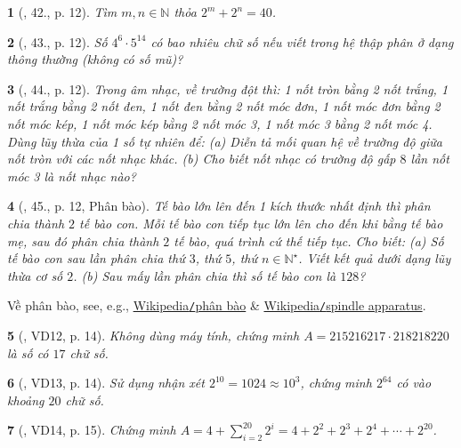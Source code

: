 \documentclass{article}
\newtheorem{baitoan}{}
\begin{document}
\begin{baitoan}[\cite{Tuyen_Toan_6}, 42., p. 12]
	Tìm $m,n\in\mathbb{N}$ thỏa $2^m + 2^n = 40$.
\end{baitoan}

\begin{baitoan}[\cite{Tuyen_Toan_6}, 43., p. 12]
	Số $4^6\cdot5^{14}$ có bao nhiêu chữ số nếu viết trong hệ thập phân ở dạng thông thường (không có số mũ)?
\end{baitoan}

\begin{baitoan}[\cite{Tuyen_Toan_6}, 44., p. 12]
	Trong âm nhạc, về trường đột thì: 1 nốt tròn bằng 2 nốt trắng, 1 nốt trắng bằng 2 nốt đen, 1 nốt đen bằng 2 nốt móc đơn, 1 nốt móc đơn bằng 2 nốt móc kép, 1 nốt móc kép bằng 2 nốt móc 3, 1 nốt móc 3 bằng 2 nốt móc 4. Dùng lũy thừa của 1 số tự nhiên để: (a) Diễn tả mối quan hệ về trường độ giữa nốt tròn với các nốt nhạc khác. (b) Cho biết nốt nhạc có trường độ gấp $8$ lần nốt móc 3 là nốt nhạc nào?
\end{baitoan}

\begin{baitoan}[\cite{Tuyen_Toan_6}, 45., p. 12, Phân bào]
	Tế bào lớn lên đến 1 kích thước nhất định thì phân chia thành $2$ tế bào con. Mỗi tế bào con tiếp tục lớn lên cho đến khi bằng tế bào mẹ, sau đó phân chia thành $2$ tế bào, quá trình cứ thế tiếp tục. Cho biết: (a) Số tế bào con sau lần phân chia thứ $3$, thứ $5$, thứ $n\in\mathbb{N}^\star$. Viết kết quả dưới dạng lũy thừa cơ số $2$. (b) Sau mấy lần phân chia thì số tế bào con là $128$?
\end{baitoan}
Về phân bào, see, e.g., \href{https://vi.wikipedia.org/wiki/Ph%C3%A2n_b%C3%A0o}{Wikipedia{\tt/}phân bào} \& \href{https://en.wikipedia.org/wiki/Spindle_apparatus}{Wikipedia{\tt/}spindle apparatus}.

\begin{baitoan}[\cite{Binh_Toan_6_tap_1}, VD12, p. 14]
	Không dùng máy tính, chứng minh $A = 215216217\cdot218218220$ là số có $17$ chữ số.
\end{baitoan}

\begin{baitoan}[\cite{Binh_Toan_6_tap_1}, VD13, p. 14]
	Sử dụng nhận xét $2^{10} = 1024\approx10^3$, chứng minh $2^{64}$ có vào khoảng $20$ chữ số.
\end{baitoan}

\begin{baitoan}[\cite{Binh_Toan_6_tap_1}, VD14, p. 15]
	Chứng minh $A = 4 + \sum_{i=2}^{20} 2^i = 4 + 2^2 + 2^3 + 2^4 + \cdots + 2^{20}$.
\end{baitoan}
\end{document}
